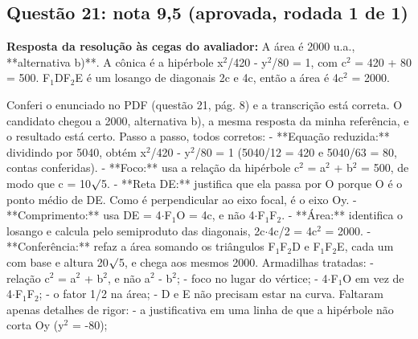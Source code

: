\documentclass{article}%
\begin{document}
\subsection*{Questão 21: nota 9,5 (aprovada, rodada 1 de 1)}%
\textbf{Resposta da resolução às cegas do avaliador:} A área é 2000 u.a., **alternativa b)**. A cônica é a hipérbole x$^2$/420 - y$^2$/80 = 1, com c$^2$ = 420 + 80 = 500. F$_{1}$DF$_{2}$E é um losango de diagonais 2c e 4c, então a área é 4c$^2$ = 2000.\par %
Conferi o enunciado no PDF (questão 21, pág. 8) e a transcrição está correta. O candidato chegou a 2000, alternativa b), a mesma resposta da minha referência, e o resultado está certo.\newline%
\newline%
Passo a passo, todos corretos:\newline%
{-} **Equação reduzida:** dividindo por 5040, obtém x$^2$/420 - y$^2$/80 = 1 (5040/12 = 420 e 5040/63 = 80, contas conferidas).\newline%
{-} **Foco:** usa a relação da hipérbole c$^2$ = a$^2$ + b$^2$ = 500, de modo que c = 10$\surd$5.\newline%
{-} **Reta DE:** justifica que ela passa por O porque O é o ponto médio de DE. Como é perpendicular ao eixo focal, é o eixo Oy.\newline%
{-} **Comprimento:** usa DE = 4$\cdot$F$_{1}$O = 4c, e não 4$\cdot$F$_{1}$F$_{2}$.\newline%
{-} **Área:** identifica o losango e calcula pelo semiproduto das diagonais, 2c$\cdot$4c/2 = 4c$^2$ = 2000.\newline%
{-} **Conferência:** refaz a área somando os triângulos F$_{1}$F$_{2}$D e F$_{1}$F$_{2}$E, cada um com base e altura 20$\surd$5, e chega aos mesmos 2000.\newline%
\newline%
Armadilhas tratadas:\newline%
{-} relação c$^2$ = a$^2$ + b$^2$, e não a$^2$ - b$^2$;\newline%
{-} foco no lugar do vértice;\newline%
{-} 4$\cdot$F$_{1}$O em vez de 4$\cdot$F$_{1}$F$_{2}$;\newline%
{-} o fator 1/2 na área;\newline%
{-} D e E não precisam estar na curva.\newline%
\newline%
Faltaram apenas detalhes de rigor:\newline%
{-} a justificativa em uma linha de que a hipérbole não corta Oy (y$^2$ = -80);\newline%
\end{document}
